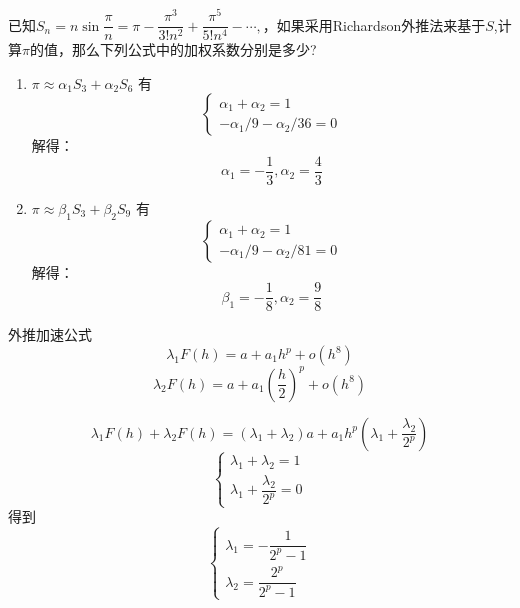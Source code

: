 \begin{example}
    已知$S_{n}=n\sin\dfrac{\pi}{n}=\pi-\dfrac{\pi^{3}}{3!n^{2}}+\dfrac{\pi^{5}}{5!n^{4}}-\cdots,$，如果采用Richardson外推法来基于$S$,计算$\pi$的值，那么下列公式中的加权系数分别是多少?
    \begin{solution}
        \begin{enumerate}
            \item $\pi\approx\alpha_{1}S_{3}+\alpha_{2}S_{6}$
            有
            \[
                \left\{
                    \begin{array}{l}
                        \alpha_1+\alpha_2 = 1\\
                        -\alpha_1/9-\alpha_2/36 = 0
                    \end{array}
                \right.
            \]
            解得：
            \[
                \alpha_1 = -\dfrac{1}{3},\alpha_2 =\dfrac{4}{3}
            \]
            \item $\pi\approx\beta_1S_3+\beta_2S_9$
            有
            \[
                \left\{
                    \begin{array}{l}
                        \alpha_1+\alpha_2 = 1\\
                        -\alpha_1/9-\alpha_2/81 = 0
                    \end{array}
                \right.
            \]
            解得：
            \[
                \beta_1 = -\dfrac{1}{8},\alpha_2 =\dfrac{9}{8}
            \]
        \end{enumerate}
    \end{solution}
\end{example}
\begin{example}
    外推加速公式
    \[
        \lambda_{1}F(h) = a+a_1h^p+o(h^8)
    \]
    \[
        \lambda_{2}F(h) = a+a_1\left( \dfrac{h}{2} \right)^p+o(h^8)
    \]
    \begin{solution}
        \[
        \lambda_{1}F(h)+\lambda_{2}F(h) =( \lambda_{1}+ \lambda_{2})a + a_1h^p(\lambda_1+\dfrac{\lambda_2}{2^p})
        \]
        \[
            \left\{
                \begin{array}{l}
                    \lambda_1+\lambda_2 = 1\\
                    \lambda_1+\dfrac{\lambda_2}{2^p} = 0
                \end{array}
            \right.
        \]
        得到
        \[
            \left\{
                \begin{array}{l}
                    \lambda_1 = -\dfrac{1}{2^p-1} \\
                    \lambda_2 = \dfrac{2^p}{2^p-1}
                \end{array}
            \right.
        \]
    \end{solution}
\end{example}
